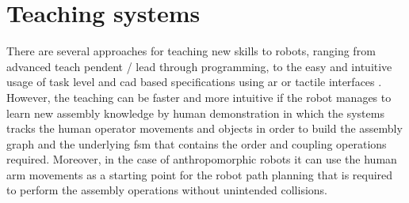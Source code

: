 


\section{Teaching systems}

There are several approaches for teaching new skills to robots, ranging from advanced teach pendent / lead through programming, to the easy and intuitive usage of task level and \gls{cad} based specifications using \gls{ar} or tactile interfaces \cite{Perzylo2015a}. However, the teaching can be faster and more intuitive if the robot manages to learn new assembly knowledge \cite{tensorflow} by human demonstration \cite{Argall2009,Hamabe2015,Wang2015} in which the systems tracks the human operator movements and objects in order to build the assembly graph and the underlying \gls{fsm} that contains the order and coupling operations required. Moreover, in the case of anthropomorphic robots it can use the human arm movements as a starting point for the robot path planning \cite{Zanchettin2012} that is required to perform the assembly operations without unintended collisions.


